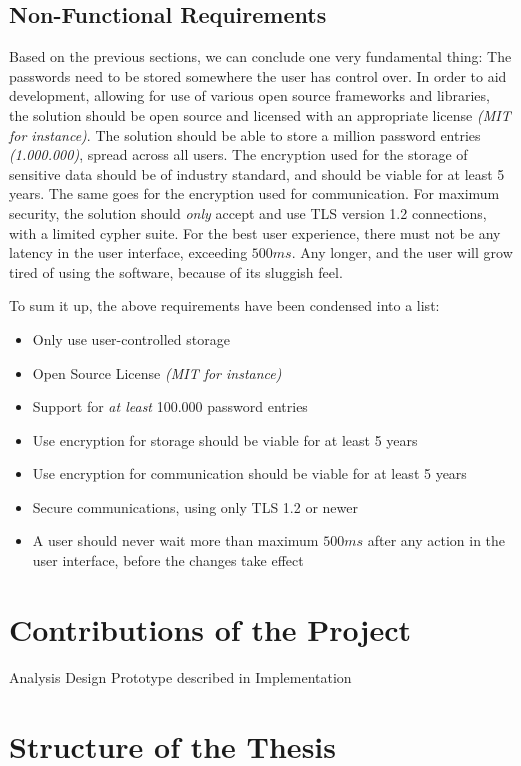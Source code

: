 		\subsection*{Non-Functional Requirements}
			Based on the previous sections, we can conclude one very fundamental thing: The passwords need to be stored somewhere the user has control over. In order to aid development, allowing for use of various open source frameworks and libraries, the solution should be open source and licensed with an appropriate license \emph{(MIT for instance)}. The solution should be able to store a million password entries \emph{(1.000.000)}, spread across all users. The encryption used for the storage of sensitive data should be of industry standard, and should be viable for at least 5 years. The same goes for the encryption used for communication. For maximum security, the solution should \emph{only} accept and use TLS version 1.2 connections, with a limited cypher suite. For the best user experience, there must not be any latency in the user interface, exceeding $500ms$. Any longer, and the user will grow tired of using the software, because of its sluggish feel.

			To sum it up, the above requirements have been condensed into a list:
			\vspace{-3ex}\begin{itemize}
				\setlength\itemsep{0.1em}
				\item Only use user-controlled storage
				\item Open Source License \emph{(MIT for instance)}
				\item Support for \emph{at least} 100.000 password entries
				\item Use encryption for storage should be viable for at least 5 years
				\item Use encryption for communication should be viable for at least 5 years
				\item Secure communications, using only TLS 1.2 or newer
				\item A user should never wait more than maximum $500ms$ after any action in the user interface, before the changes take effect
			\end{itemize}




	\section{Contributions of the Project}
		Analysis
		Design
		Prototype described in Implementation

	\section{Structure of the Thesis}